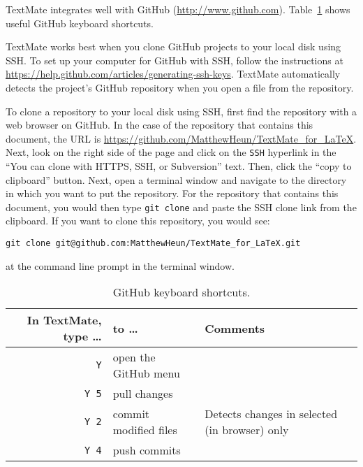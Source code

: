 \documentclass[10pt]{article}
\begin{document}
TextMate integrates well with GitHub (\url{http://www.github.com}). 
Table~\ref{tab:github_keyboard_shortcuts} shows useful GitHub keyboard shortcuts.

TextMate works best when you clone GitHub projects to your local disk using SSH. 
To set up your computer for GitHub with SSH, follow the instructions at
\url{https://help.github.com/articles/generating-ssh-keys}. 
TextMate automatically detects the project's GitHub repository 
when you open a file from the repository.

To clone a repository to your local disk using SSH, 
first find the repository with a web browser on GitHub.
In the case of the repository that contains this document, 
the URL is \url{https://github.com/MatthewHeun/TextMate_for_LaTeX}. 
Next, look on the right side of the page and click on 
the \texttt{SSH} hyperlink in the 
``You can clone with HTTPS, SSH, or Subversion'' text.
Then, click the ``copy to clipboard'' button.
Next, open a terminal window and navigate to the directory in which you want to 
put the repository.
For the repository that contains this document, you would then type
\texttt{git clone} and paste the SSH clone link from the clipboard.
If you want to clone this repository, you would see:

\verb!git clone git@github.com:MatthewHeun/TextMate_for_LaTeX.git!

\noindent at the command line prompt in the terminal window.

\begin{table}
\centering
\caption{GitHub keyboard shortcuts.}
\begin{tabular}{r|l|l}
	In TextMate, type \dots & to \dots      & Comments                                       \\
	\hline
	\cmdkey\texttt{Y}           & open the GitHub menu            &                          \\
	\cmdkey\texttt{Y 5}         & pull changes                    &                          \\
	\cmdkey\texttt{Y 2}         & commit modified files           & Detects changes in selected (in browser) only \\
	\cmdkey\texttt{Y 4}         & push commits                    &                          \\
\end{tabular}
\label{tab:github_keyboard_shortcuts}
\end{table}

\end{document}
